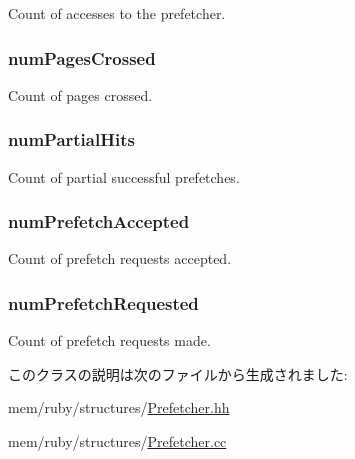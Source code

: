Count of accesses to the prefetcher. \hypertarget{classPrefetcher_a40bc6d68ddd4537932b2ac90e93dee85}{
\subsubsection[{numPagesCrossed}]{ {\bf numPagesCrossed}}}
\label{classPrefetcher_a40bc6d68ddd4537932b2ac90e93dee85}


Count of pages crossed. \hypertarget{classPrefetcher_a46a96500ada7b244799f94064bf2b24d}{
\subsubsection[{numPartialHits}]{ {\bf numPartialHits}}}
\label{classPrefetcher_a46a96500ada7b244799f94064bf2b24d}


Count of partial successful prefetches. \hypertarget{classPrefetcher_a9644f1356b157e6cf7e86db7a9356be7}{
\subsubsection[{numPrefetchAccepted}]{ {\bf numPrefetchAccepted}}}
\label{classPrefetcher_a9644f1356b157e6cf7e86db7a9356be7}


Count of prefetch requests accepted. \hypertarget{classPrefetcher_a112363546083c7fbefe26b74e3181baf}{
\subsubsection[{numPrefetchRequested}]{ {\bf numPrefetchRequested}}}
\label{classPrefetcher_a112363546083c7fbefe26b74e3181baf}


Count of prefetch requests made. 

このクラスの説明は次のファイルから生成されました:\begin{DoxyCompactItemize}
\item 
mem/ruby/structures/\hyperlink{Prefetcher_8hh}{Prefetcher.hh}\item 
mem/ruby/structures/\hyperlink{Prefetcher_8cc}{Prefetcher.cc}\end{DoxyCompactItemize}
